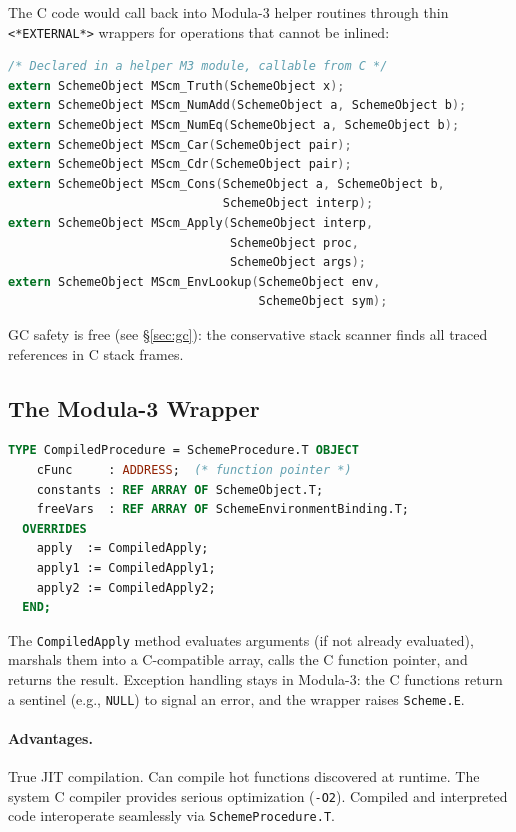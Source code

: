 \documentclass[12pt]{report}
\begin{document}
The C code would call back into Modula-3 helper routines through
thin \texttt{<*EXTERNAL*>} wrappers for operations that cannot be
inlined:

\begin{lstlisting}[language=C]
/* Declared in a helper M3 module, callable from C */
extern SchemeObject MScm_Truth(SchemeObject x);
extern SchemeObject MScm_NumAdd(SchemeObject a, SchemeObject b);
extern SchemeObject MScm_NumEq(SchemeObject a, SchemeObject b);
extern SchemeObject MScm_Car(SchemeObject pair);
extern SchemeObject MScm_Cdr(SchemeObject pair);
extern SchemeObject MScm_Cons(SchemeObject a, SchemeObject b,
                              SchemeObject interp);
extern SchemeObject MScm_Apply(SchemeObject interp,
                               SchemeObject proc,
                               SchemeObject args);
extern SchemeObject MScm_EnvLookup(SchemeObject env,
                                   SchemeObject sym);
\end{lstlisting}

GC safety is free (see \S\ref{sec:gc}): the conservative stack
scanner finds all traced references in C stack frames.

\subsection{The Modula-3 Wrapper}

\begin{lstlisting}[language=Modula3]
TYPE CompiledProcedure = SchemeProcedure.T OBJECT
    cFunc     : ADDRESS;  (* function pointer *)
    constants : REF ARRAY OF SchemeObject.T;
    freeVars  : REF ARRAY OF SchemeEnvironmentBinding.T;
  OVERRIDES
    apply  := CompiledApply;
    apply1 := CompiledApply1;
    apply2 := CompiledApply2;
  END;
\end{lstlisting}

The \texttt{CompiledApply} method evaluates arguments (if not
already evaluated), marshals them into a C-compatible array, calls
the C function pointer, and returns the result.  Exception handling
stays in Modula-3: the C functions return a sentinel (e.g.,
\texttt{NULL}) to signal an error, and the wrapper raises
\texttt{Scheme.E}.

\paragraph{Advantages.}
True JIT compilation.  Can compile hot functions discovered at
runtime.  The system C compiler provides serious optimization
(\texttt{-O2}).  Compiled and interpreted code interoperate
seamlessly via \texttt{SchemeProcedure.T}.
\end{document}
